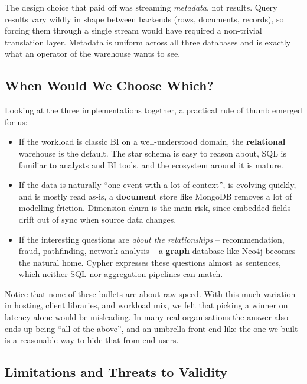 \documentclass[11pt,a4paper]{article}
\begin{document}
The design choice that paid off was streaming \emph{metadata}, not
results. Query results vary wildly in shape between backends (rows,
documents, records), so forcing them through a single stream would have
required a non-trivial translation layer. Metadata is uniform across all
three databases and is exactly what an operator of the warehouse wants
to see.

\subsection{When Would We Choose Which?}

Looking at the three implementations together, a practical rule of
thumb emerged for us:

\begin{itemize}[leftmargin=*]
    \item If the workload is classic BI on a well-understood domain,
          the \textbf{relational} warehouse is the default. The star
          schema is easy to reason about, SQL is familiar to analysts
          and BI tools, and the ecosystem around it is mature.
    \item If the data is naturally ``one event with a lot of context'',
          is evolving quickly, and is mostly read as-is, a
          \textbf{document} store like MongoDB removes a lot of
          modelling friction. Dimension churn is the main risk, since
          embedded fields drift out of sync when source data changes.
    \item If the interesting questions are \emph{about the
          relationships} -- recommendation, fraud, pathfinding, network
          analysis -- a \textbf{graph} database like Neo4j becomes the
          natural home. Cypher expresses these questions almost as
          sentences, which neither SQL nor aggregation pipelines can
          match.
\end{itemize}

Notice that none of these bullets are about raw speed. With this much
variation in hosting, client libraries, and workload mix, we felt that
picking a winner on latency alone would be misleading. In many real
organisations the answer also ends up being ``all of the above'', and an
umbrella front-end like the one we built is a reasonable way to hide
that from end users.

\subsection{Limitations and Threats to Validity}
\end{document}
